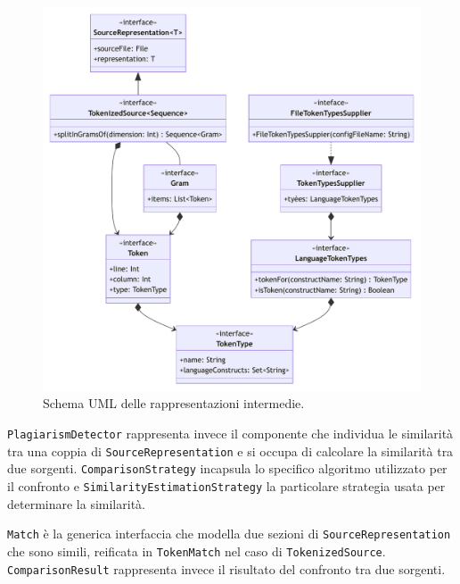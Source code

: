 \begin{figure}[h!]
    \centering
    \includegraphics[width=\textwidth]{resources/img/02-representations.pdf}
    \caption{Schema UML delle rappresentazioni intermedie.}
    \label{img:02-representations}
\end{figure}

\texttt{PlagiarismDetector} rappresenta invece il componente che individua le similarità tra una coppia di \texttt{SourceRepresentation} e si occupa di calcolare la similarità tra due sorgenti.
%
\texttt{ComparisonStrategy} incapsula lo specifico algoritmo utilizzato per il confronto e \texttt{SimilarityEstimationStrategy} la particolare strategia usata per determinare la similarità.

\texttt{Match} è la generica interfaccia che modella due sezioni di \texttt{SourceRepresentation} che sono simili, reificata in \texttt{TokenMatch} nel caso di \texttt{TokenizedSource}.
%
\texttt{ComparisonResult} rappresenta invece il risultato del confronto tra due sorgenti.

